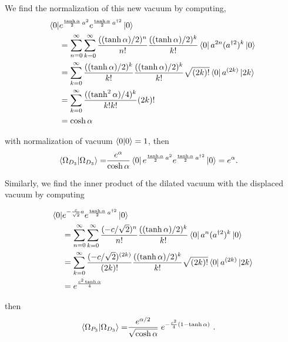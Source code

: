 \documentclass[%
 reprint,
superscriptaddress,
 amsmath,amssymb,
 aps,
]{revtex4-2}
\begin{document}
We find the normalization of this new vacuum by computing,
\begin{align}
    \bra{0}&e^{\frac{\tanh\alpha}{2}\,a^{2}} e^{\frac{\tanh\alpha}{2}\,a^{\dagger2}}\ket{0}\nonumber\\
    &=\sum_{n=0}^{\infty}\sum_{k=0}^{\infty}\frac{((\tanh\alpha)/2)^n}{n!}\frac{((\tanh\alpha)/2)^k}{k!}\bra{0}a^{2n} (a^{\dagger2})^k\ket{0}\nonumber\\
    &=\sum_{k=0}^{\infty}\frac{((\tanh\alpha)/2)^k}{k!}\frac{((\tanh\alpha)/2)^k}{k!}\sqrt{(2k)!}\bra{0}a^{(2k)} \ket{2k}\nonumber\\
    &=\sum_{k=0}^{\infty}\frac{((\tanh^2{\alpha})/4)^k}{k!k!}(2k)!\nonumber\\
    &=\cosh{\alpha}
\end{align}

with normalization of vacuum $\braket{0|0}=1$, then
\begin{align}
    \braket{\Omega_{D_{3}}|\Omega_{D_{3}}} =&  \frac{e^{\alpha}}{\cosh\alpha}  \bra{0}e^{\frac{\tanh\alpha}{2}\,a^{2}} e^{\frac{\tanh\alpha}{2}\,a^{\dagger2}}\ket{0}=e^{\alpha}.
\end{align}

Similarly, we find the inner product of the dilated vacuum with
the displaced vacuum by computing

\begin{align}
    \bra{0}&e^{-\frac{c}{\sqrt{2}}a} e^{\frac{\tanh\alpha}{2}\,a^{\dagger2}}\ket{0}\nonumber\\
    &=\sum_{n=0}^{\infty}\sum_{k=0}^{\infty}\frac{(-c/\sqrt{2})^n}{n!}\frac{((\tanh\alpha)/2)^k}{k!}\bra{0}a^n (a^{\dagger2})^k\ket{0}\nonumber\\
    &=\sum_{k=0}^{\infty}\frac{(-c/\sqrt{2})^{(2k)}}{(2k)!}\frac{((\tanh\alpha)/2)^k}{k!}\sqrt{(2k)!}\bra{0}a^{(2k)} \ket{2k}\nonumber\\
    &=e^{\frac{c^2\tanh\alpha}{4}}
\end{align}

then
\begin{align}
    \braket{\Omega_{P_{3}}|\Omega_{D_{3}}} =& \frac{e^{\alpha/2}}{\sqrt{\cosh\alpha}}\; e^{-\frac{c^2}{4}(1-\tanh\alpha)}~.
\end{align}


\end{document}
